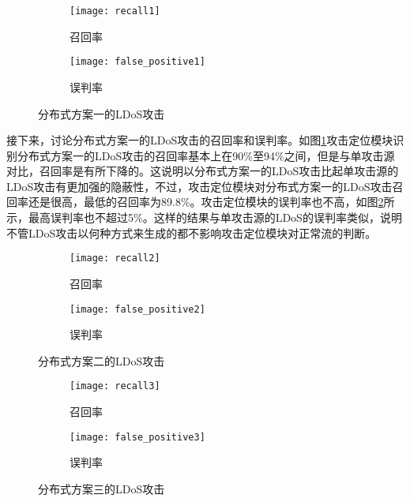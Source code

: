 \begin{figure}
    \begin{subfigure}{.49\textwidth}
        \centering
        \texttt{[image: recall1]}
        \caption{召回率}
        \label{fig:recall1}
    \end{subfigure}
    \begin{subfigure}{.49\textwidth}
        \centering
        \texttt{[image: false\_positive1]}
        \caption{误判率}
        \label{fig:false-positive1}
    \end{subfigure}
    \caption{分布式方案一的LDoS攻击}
    \label{fig:accuracy-2h-mod1}
\end{figure}

接下来，讨论分布式方案一的LDoS攻击的召回率和误判率。如图\ref{fig:recall1}攻击定位模块识别分布式方案一的LDoS攻击的召回率基本上在90\%至94\%之间，但是与单攻击源对比，召回率是有所下降的。这说明以分布式方案一的LDoS攻击比起单攻击源的LDoS攻击有更加强的隐蔽性，不过，攻击定位模块对分布式方案一的LDoS攻击召回率还是很高，最低的召回率为89.8\%。攻击定位模块的误判率也不高，如图\ref{fig:false-positive1}所示，最高误判率也不超过5\%。这样的结果与单攻击源的LDoS的误判率类似，说明不管LDoS攻击以何种方式来生成的都不影响攻击定位模块对正常流的判断。

\begin{figure}
    \begin{subfigure}{.49\textwidth}
        \centering
        \texttt{[image: recall2]}
        \caption{召回率}
        \label{fig:recall2}
    \end{subfigure}
    \begin{subfigure}{.49\textwidth}
        \centering
        \texttt{[image: false\_positive2]}
        \caption{误判率}
        \label{fig:false-positive2}
    \end{subfigure}
    \caption{分布式方案二的LDoS攻击}
    \label{fig:accuracy-2h-mod2}
\end{figure}

\begin{figure}
    \begin{subfigure}{.49\textwidth}
        \centering
        \texttt{[image: recall3]}
        \caption{召回率}
        \label{fig:recall3}
    \end{subfigure}
    \begin{subfigure}{.49\textwidth}
        \centering
        \texttt{[image: false\_positive3]}
        \caption{误判率}
        \label{fig:false-positive3}
    \end{subfigure}
    \caption{分布式方案三的LDoS攻击}
    \label{fig:accuracy-2h-mod3}
\end{figure}

